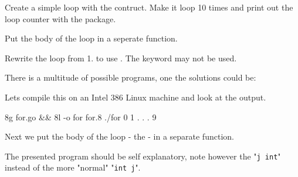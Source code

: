\begin{Exercise}[title={For-loop},difficulty=1]
\label{ex:for-loop}
\Question \label{ex:for-loop q1} Create a simple loop with the  contruct. Make it loop
10 times and print out the loop counter with the  package.

\Question \label{ex:for-loop q2} Put the body of the loop in a seperate function.

\Question \label{ex:for-loop q3} Rewrite the loop from 1. to use . The
keyword  may not be used.
\end{Exercise}

\begin{Answer}

\Question There is a multitude of possible programs, 
one the solutions could be:

Lets compile this on an Intel 386 Linux machine and look at the
output.
\begin{display}
\pr 8g for.go && 8l -o for for.8
\pr ./for
0
1
.
.
.
9
\end{display}

\Question Next we put the body of the 
loop - the  - in a separate function.

The presented program should be self explanatory, note however the
"\lstinline{j int}" instead of the more "normal" "\lstinline{int j}".
\end{Answer}
